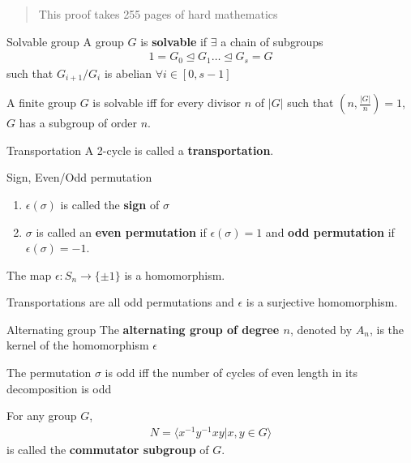 \documentclass[titlepage, 12pt]{article}
\begin{document}
\begin{quotation}
This proof takes 255 pages of hard mathematics
\end{quotation}
\begin{definition}{Solvable group}{}
    A group $G$ is \textbf{solvable} if $\exists$ a chain of subgroups
    \begin{gather*}
        1 = G_0\trianglelefteq G_1\dots\trianglelefteq G_s = G
    \end{gather*}
    such that $G_{i+1}/G_i$ is abelian $\forall i\in[0, s - 1]$
\end{definition}
\begin{theorem}{}{}
    A finite group $G$ is solvable iff for every divisor $n$ of $|G|$ such that
    $(n, \frac{|G|}{n}) = 1$, $G$ has a subgroup of order $n$.
\end{theorem}
\begin{definition}{Transportation}{}
    A 2-cycle is called a \textbf{transportation}.
\end{definition}
\begin{definition}{Sign, Even/Odd permutation}{}
    \begin{enumerate}
        \item $\epsilon(\sigma)$ is called the \textbf{sign} of $\sigma$
        \item $\sigma$ is called an \textbf{even permutation} if
            $\epsilon(\sigma) = 1$ and \textbf{odd permutation} if
            $\epsilon(\sigma) = -1$.
    \end{enumerate}
\end{definition}
\begin{proposition}{}{}
    The map $\epsilon:S_n\rightarrow\{\pm 1\}$ is a homomorphism.
\end{proposition}
\begin{proposition}{}{}
    Transportations are all odd permutations and $\epsilon$ is a surjective
    homomorphism.
\end{proposition}
\begin{definition}{Alternating group}{}
    The \textbf{alternating group of degree $n$}, denoted by $A_n$, is the
    kernel of the homomorphism $\epsilon$
\end{definition}
\begin{proposition}{}{}
    The permutation $\sigma$ is odd iff the number of cycles of even length in
    its decomposition is odd
\end{proposition}
\begin{definition}{}{}
    For any group $G$,
    \begin{gather*}
        N = \langle x^{-1}y^{-1}xy | x, y\in G\rangle
    \end{gather*}
    is called the \textbf{commutator subgroup} of $G$.
\end{definition}
\end{document}
